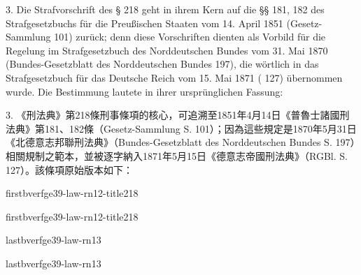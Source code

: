 \documentclass[12pt]{article}
\begin{document}
\syncleft
\begin{sourcepara}
3. Die Strafvorschrift des § 218 \abbrStGB{} geht in ihrem Kern auf die §§ 181, 182 des Strafgesetzbuchs für die Preußischen Staaten vom 14. April 1851 (Gesetz-Sammlung \abbrS{} 101) zurück; denn diese Vorschriften dienten als Vorbild für die Regelung im Strafgesetzbuch des Norddeutschen Bundes vom 31. Mai 1870 (Bundes-Gesetzblatt des Norddeutschen Bundes \abbrS{} 197), die wörtlich in das Strafgesetzbuch für das Deutsche Reich vom 15. Mai 1871 (\abbrRGBl{} \abbrS{} 127) übernommen wurde. Die Bestimmung lautete in ihrer ursprünglichen Fassung:
\end{sourcepara}
\begin{transpara}
3. 《刑法典》第218條刑事條項的核心，可追溯至1851年4月14日《普魯士諸國刑法典》第181、182條（Gesetz-Sammlung S. 101）；因為這些規定是1870年5月31日《北德意志邦聯刑法典》（Bundes-Gesetzblatt des Norddeutschen Bundes S. 197）相關規制之範本，並被逐字納入1871年5月15日《德意志帝國刑法典》（RGBl. S. 127）。該條項原始版本如下：
\end{transpara}

\syncleft
\begin{sourceboxpara}
\begin{lawboxpart}{first}{bverfge39-law-rn12-title218}
\end{lawboxpart}
\end{sourceboxpara}
\begin{transboxpara}
\begin{lawboxpart}{first}{bverfge39-law-rn12-title218}
\end{lawboxpart}
\end{transboxpara}

\syncleft
\begin{sourceboxpara}
\begin{lawboxpart}{last}{bverfge39-law-rn13}
\end{lawboxpart}
\end{sourceboxpara}
\begin{transboxpara}
\begin{lawboxpart}{last}{bverfge39-law-rn13}
\end{lawboxpart}
\end{transboxpara}
\end{document}
